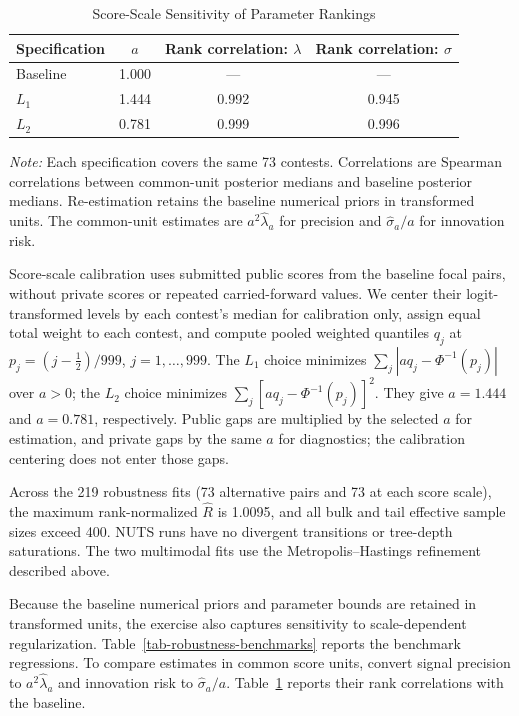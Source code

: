 \documentclass[mnsc]{informs3}
\begin{document}
\begin{APPENDICES}
\begin{table}[!htbp]
\centering
\caption{Score-Scale Sensitivity of Parameter Rankings}
\label{tab-score-scale-robustness}
\begin{tabular}{lccc}
\toprule
Specification & $a$ & Rank correlation: $\lambda$ & Rank correlation: $\sigma$\\
\midrule
Baseline & 1.000 & --- & ---\\
$L_1$ & 1.444 & 0.992 & 0.945\\
$L_2$ & 0.781 & 0.999 & 0.996\\
\bottomrule
\end{tabular}
\par\vspace{0.5ex}\noindent
\begin{minipage}{\textwidth}
{\footnotesize\textit{Note:} Each specification covers the same 73 contests. Correlations are Spearman correlations between common-unit posterior medians and baseline posterior medians. Re-estimation retains the baseline numerical priors in transformed units.}
{The common-unit estimates are $a^2\hat\lambda_a$ for precision and $\hat\sigma_a/a$ for innovation risk.}
\end{minipage}
\end{table}

{Score-scale calibration uses submitted public scores from the baseline focal pairs, without private scores or repeated carried-forward values. We center their logit-transformed levels by each contest's median for calibration only, assign equal total weight to each contest, and compute pooled weighted quantiles $q_j$ at $p_j=(j-\tfrac12)/999$, $j=1,\ldots,999$. The $L_1$ choice minimizes $\sum_j|a q_j-\Phi^{-1}(p_j)|$ over $a>0$; the $L_2$ choice minimizes $\sum_j[a q_j-\Phi^{-1}(p_j)]^2$. They give $a=1.444$ and $a=0.781$, respectively. Public gaps are multiplied by the selected $a$ for estimation, and private gaps by the same $a$ for diagnostics; the calibration centering does not enter those gaps.}

Across the 219 robustness fits (73 alternative pairs and 73 at each score scale), the maximum rank-normalized $\widehat R$ is 1.0095, and all bulk and tail effective sample sizes exceed 400. NUTS runs have no divergent transitions or tree-depth saturations. The two multimodal fits use the Metropolis--Hastings refinement described above.

Because the baseline numerical priors and parameter bounds are retained in transformed units, the exercise also captures sensitivity to scale-dependent regularization. Table~\ref{tab-robustness-benchmarks} reports the benchmark regressions.
To compare estimates in common score units, convert signal precision to $a^2\hat\lambda_a$ and innovation risk to $\hat\sigma_a/a$. Table~\ref{tab-score-scale-robustness} reports their rank correlations with the baseline.




\end{APPENDICES}
\end{document}
